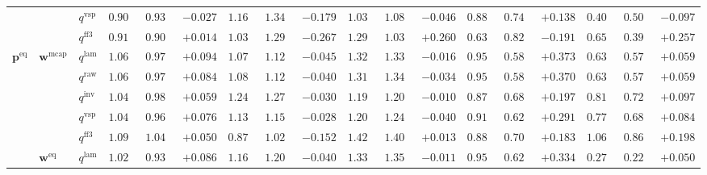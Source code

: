 \documentclass{article}
\begin{document}
\begin{table}[!htbp]
{\begin{tabular}{lll ccc ccc ccc ccc ccc}
 &  & $q^{\mathrm{vsp}}$ & $0.909$ & $0.935$ & \cellcolor{negred!50}$-0.027$ & $1.167$ & $1.346$ & \cellcolor{negred!50}$-0.179$ & $1.039$ & $1.086$ & \cellcolor{negred!50}$-0.046$ & $0.881$ & $0.742$ & \cellcolor{posgreen!50}$+0.138$ & $0.409$ & $0.506$ & \cellcolor{negred!50}$-0.097$ \\
 &  & $q^{\mathrm{ff3}}$ & $0.918$ & $0.904$ & \cellcolor{posgreen!50}$+0.014$ & $1.032$ & $1.299$ & \cellcolor{negred!50}$-0.267$ & $1.298$ & $1.038$ & \cellcolor{posgreen!50}$+0.260$ & $0.638$ & $0.829$ & \cellcolor{negred!50}$-0.191$ & $0.651$ & $0.394$ & \cellcolor{posgreen!50}$+0.257$ \\
\midrule
$\mathbf{p}^{\mathrm{eq}}$ & $\mathbf{w}^{\mathrm{mcap}}$ & $q^{\mathrm{lam}}$ & $1.067$ & $0.973$ & \cellcolor{posgreen!50}$+0.094$ & $1.076$ & $1.120$ & \cellcolor{negred!50}$-0.045$ & $1.320$ & $1.335$ & \cellcolor{negred!50}$-0.016$ & $0.956$ & $0.583$ & \cellcolor{posgreen!50}$+0.373$ & $0.638$ & $0.578$ & \cellcolor{posgreen!50}$+0.059$ \\
 &  & $q^{\mathrm{raw}}$ & $1.060$ & $0.976$ & \cellcolor{posgreen!50}$+0.084$ & $1.085$ & $1.125$ & \cellcolor{negred!50}$-0.040$ & $1.311$ & $1.345$ & \cellcolor{negred!50}$-0.034$ & $0.953$ & $0.583$ & \cellcolor{posgreen!50}$+0.370$ & $0.638$ & $0.578$ & \cellcolor{posgreen!50}$+0.059$ \\
 &  & $q^{\mathrm{inv}}$ & $1.047$ & $0.988$ & \cellcolor{posgreen!50}$+0.059$ & $1.240$ & $1.270$ & \cellcolor{negred!50}$-0.030$ & $1.195$ & $1.205$ & \cellcolor{negred!50}$-0.010$ & $0.878$ & $0.681$ & \cellcolor{posgreen!50}$+0.197$ & $0.816$ & $0.720$ & \cellcolor{posgreen!50}$+0.097$ \\
 &  & $q^{\mathrm{vsp}}$ & $1.040$ & $0.963$ & \cellcolor{posgreen!50}$+0.076$ & $1.131$ & $1.158$ & \cellcolor{negred!50}$-0.028$ & $1.205$ & $1.245$ & \cellcolor{negred!50}$-0.040$ & $0.914$ & $0.624$ & \cellcolor{posgreen!50}$+0.291$ & $0.772$ & $0.688$ & \cellcolor{posgreen!50}$+0.084$ \\
 &  & $q^{\mathrm{ff3}}$ & $1.099$ & $1.049$ & \cellcolor{posgreen!50}$+0.050$ & $0.872$ & $1.024$ & \cellcolor{negred!50}$-0.152$ & $1.421$ & $1.408$ & \cellcolor{posgreen!50}$+0.013$ & $0.888$ & $0.705$ & \cellcolor{posgreen!50}$+0.183$ & $1.066$ & $0.868$ & \cellcolor{posgreen!50}$+0.198$ \\
\cmidrule(lr){2-18}
 & $\mathbf{w}^{\mathrm{eq}}$ & $q^{\mathrm{lam}}$ & $1.022$ & $0.935$ & \cellcolor{posgreen!50}$+0.086$ & $1.163$ & $1.203$ & \cellcolor{negred!50}$-0.040$ & $1.339$ & $1.350$ & \cellcolor{negred!50}$-0.011$ & $0.955$ & $0.621$ & \cellcolor{posgreen!50}$+0.334$ & $0.277$ & $0.227$ & \cellcolor{posgreen!50}$+0.050$ \\

\end{tabular}}
\end{table}
\end{document}
